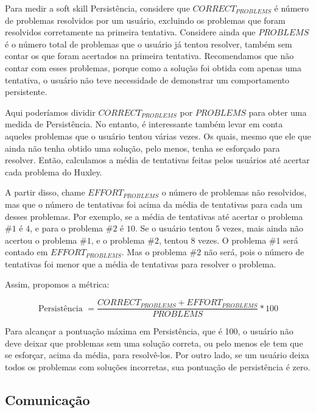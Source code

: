 
Para medir a soft skill Persistência, considere que $CORRECT_{PROBLEMS}$ é número de problemas resolvidos por um usuário, excluindo os problemas que foram resolvidos corretamente na primeira tentativa. Considere ainda que $PROBLEMS$ é o número total de problemas que o usuário já tentou resolver, também sem contar os que foram acertados na primeira tentativa. Recomendamos que não contar com esses problemas, porque como a solução foi obtida com apenas uma tentativa, o usuário não teve necessidade de demonstrar um comportamento persistente.

Aqui poderíamos dividir $CORRECT_{PROBLEMS}$ por $PROBLEMS$ para obter uma medida de Persistência.
No entanto, é interessante também levar em conta aqueles problemas que o usuário tentou várias vezes. Os quais, mesmo que ele que ainda não tenha obtido uma solução, pelo menos, tenha se esforçado para resolver. Então, calculamos a média de tentativas feitas pelos usuários até acertar cada problema do Huxley.

A partir disso, chame $EFFORT_{PROBLEMS}$ o número de problemas não resolvidos, mas que o número de tentativas foi acima da média de tentativas para cada um desses problemas. 
Por exemplo, se a média de tentativas até acertar o problema $\#1$ é $4$, e para o problema $\#2$ é $10$. Se o usuário tentou $5$ vezes, mais ainda não acertou o problema $\#1$, e o problema $\#2$, tentou $8$ vezes. O problema $\#1$ será contado em $EFFORT_{PROBLEMS}$. Mas o problema $\#2$ não será, pois o número de tentativas foi menor que a média de tentativas para resolver o problema.

Assim, propomos a métrica:

\begin{equation} \label{m:persistencia}
\mbox{Persistência } = \frac{ CORRECT_{PROBLEMS} + EFFORT_{PROBLEMS} }{ PROBLEMS } * 100
\end{equation}

Para alcançar a pontuação máxima em Persistência, que é 100, o usuário não deve deixar que problemas sem uma solução correta, ou pelo menos ele tem que se esforçar, acima da média, para resolvê-los. Por outro lado, se um usuário deixa todos os problemas com soluções incorretas, sua pontuação de persistência é zero.

\subsection{Comunicação}

